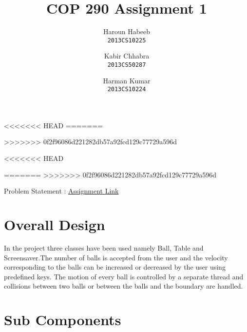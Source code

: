 \documentclass[]{article}
\begin{document}
<<<<<<< HEAD
=======

>>>>>>> 0f2f96086d221282db57a92fcd129c77729a596d
\author{
  Haroun Habeeb\\
  \texttt{2013CS10225}
  \and
  Kabir Chhabra\\
  \texttt{2013CS50287}
  \and
  Harman Kumar\\
  \texttt{2013CS10224}
}
<<<<<<< HEAD

=======
>>>>>>> 0f2f96086d221282db57a92fcd129c77729a596d
\title{COP 290 Assignment 1}
\maketitle



\begin{center}

Problem Statement : \href { http://www.cse.iitd.ac.in/~prathmesh/ta/COP290/ass1.html }{Assignment Link}

\end{center}


\section{Overall Design}

\begin{flushleft}

In the project three classes have been used namely Ball, Table and Screensaver.The number of balls is accepted from the user and the velocity corresponding to the balls can be increased or decreased by the user using predefined keys. The motion of every ball is controlled by a separate thread and collisions between two balls or between the balls and the boundary are handled.

\end{flushleft} 


\section{Sub Components}
\end{document}
